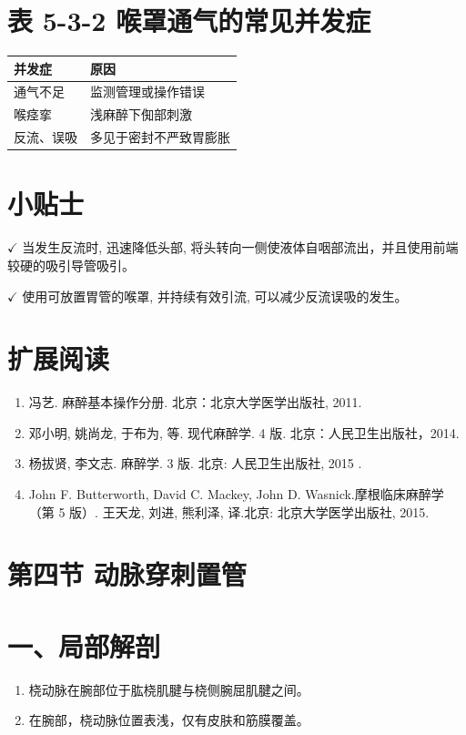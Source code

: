 \documentclass[10pt]{article}
\begin{document}
\section*{表 5-3-2 喉罩通气的常见并发症}
\begin{center}
\begin{tabular}{ll}
\hline
并发症 & 原因 \\
\hline
通气不足 & 监测管理或操作错误 \\
喉痉挛 & 浅麻醉下倁部刺激 \\
反流、误吸 & 多见于密封不严致胃膨胀 \\
\hline
\end{tabular}
\end{center}

\section*{小贴士}
$\checkmark$ 当发生反流时, 迅速降低头部, 将头转向一侧使液体自咽部流出，并且使用前端较硬的吸引导管吸引。

$\checkmark$ 使用可放置胃管的喉罩, 并持续有效引流, 可以减少反流误吸的发生。

\section*{扩展阅读}
\begin{enumerate}
  \item 冯艺. 麻醉基本操作分册. 北京：北京大学医学出版社, 2011.

  \item 邓小明, 姚尚龙, 于布为, 等. 现代麻醉学. 4 版. 北京：人民卫生出版社，2014.

  \item 杨拔贤, 李文志. 麻醉学. 3 版. 北京: 人民卫生出版社, 2015 .

  \item John F. Butterworth, David C. Mackey, John D. Wasnick.摩根临床麻醉学（第 5 版）. 王天龙, 刘进, 熊利泽, 译.北京: 北京大学医学出版社, 2015.

\end{enumerate}

\section*{第四节 动脉穿刺置管}
\section*{一、局部解剖}
\begin{enumerate}
  \item 桡动脉在腕部位于肱桡肌腱与桡侧腕屈肌腱之间。

  \item 在腕部，桡动脉位置表浅，仅有皮肤和筋膜覆盖。

\end{enumerate}
\end{document}
